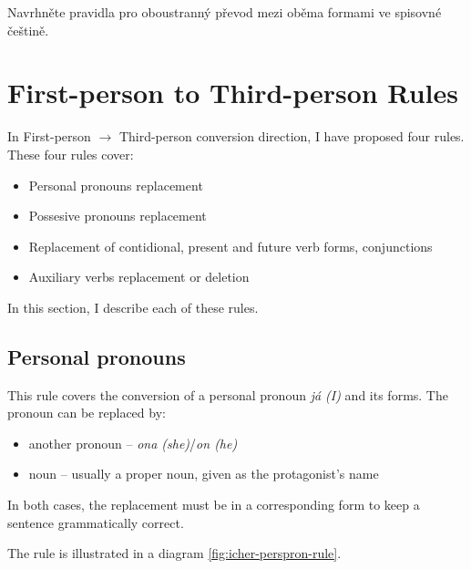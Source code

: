 Navrhněte pravidla pro oboustranný převod mezi oběma formami ve spisovné češtině.


\section{First-person to Third-person Rules}
In First-person $\rightarrow$ Third-person conversion direction, I have proposed four rules. These four rules cover:
	\begin{itemize}
		\item Personal pronouns replacement
		\item Possesive pronouns replacement
		\item Replacement of contidional, present and future verb forms, conjunctions
		\item Auxiliary verbs replacement or deletion
	\end{itemize}

In this section, I describe each of these rules.

\subsection{Personal pronouns}

This rule covers the conversion of a personal pronoun \emph{já (I)} and its forms. The pronoun can be replaced by:
	\begin{itemize}
		\item another pronoun -- \emph{ona (she)}/\emph{on (he)}
		\item noun -- usually a proper noun, given as the protagonist's name
	\end{itemize}

In both cases, the replacement must be in a corresponding form to keep a sentence grammatically correct.

The rule is illustrated in a diagram \ref{fig:icher-perspron-rule}.

